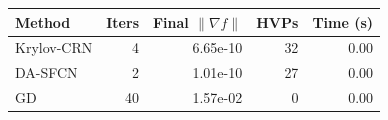\begin{tabular}{@{}lrrrr@{}}
\toprule
Method & Iters & Final $\|\nabla f\|$ & HVPs & Time (s) \\
\midrule
Krylov-CRN & 4 & 6.65e-10 & 32 & 0.00 \\
DA-SFCN & 2 & 1.01e-10 & 27 & 0.00 \\
GD & 40 & 1.57e-02 & 0 & 0.00 \\
\bottomrule
\end{tabular}